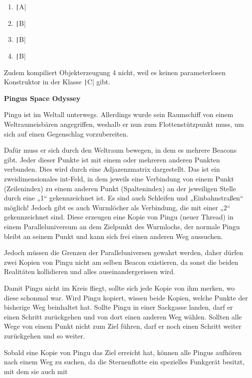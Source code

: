 \documentclass[11pt]{exam} %
\newcommand{\code}[1]{\texttt|#1|}
\begin{document}
\begin{questions}
\begin{solution}
\begin{enumerate}
\item \code{A}\par
\item \code{B}\par
\item \code{B}\par
\item \code{B}\par
\end{enumerate}
Zudem kompiliert Objekterzeugung 4 nicht, weil es keinen parameterlosen Konstruktor in der Klasse \code{C} gibt.
\end{solution}
\question \textbf{Pingus Space Odyssey}\par\nobreak
Pingu ist im Weltall unterwegs. Allerdings wurde sein Raumschiff von einem Weltraumeisbären angegriffen, weshalb er nun zum Flottenstützpunkt muss, um sich auf einen Gegenschlag vorzubereiten.\par
Dafür muss er sich durch den Weltraum bewegen, in dem es mehrere Beacons gibt. Jeder dieser
Punkte ist mit einem oder mehreren anderen Punkten verbunden. Dies wird durch eine
Adjazenzmatrix dargestellt. Das ist ein zweidimensionales int-Feld, in dem jeweils eine Verbindung
von einem Punkt (Zeilenindex) zu einem anderen Punkt (Spaltenindex) an der jeweiligen Stelle
durch eine „1“ gekennzeichnet ist. Es sind auch Schleifen und „Einbahnstraßen“ möglich!
Jedoch gibt es auch Wurmlöcher als Verbindung, die mit einer „2“ gekennzeichnet sind. Diese
erzeugen eine Kopie von Pingu (neuer Thread) in einem Paralleluniversum an dem Zielpunkt des
Wurmlochs, der normale Pingu bleibt an seinem Punkt und kann sich frei einen anderen Weg
aussuchen.\par
Jedoch müssen die Grenzen der Paralleluniversen gewahrt werden, daher dürfen zwei Kopien von
Pingu nicht am selben Beacon existieren, da sonst die beiden Realitäten kollidieren und alles
auseinandergerissen wird.\par
Damit Pingu nicht im Kreis fliegt, sollte sich jede Kopie von ihm merken, wo diese schonmal war.
Wird Pingu kopiert, wissen beide Kopien, welche Punkte der bisherige Weg beinhaltet hat.
Sollte Pingu in einer Sackgasse landen, darf er einen Schritt zurückgehen und von dort einen
anderen Weg wählen. Sollten alle Wege von einem Punkt nicht zum Ziel führen, darf er noch einen
Schritt weiter zurückgehen und so weiter.\par
Sobald eine Kopie von Pingu das Ziel erreicht hat, können alle Pingus aufhören nach einem Weg
zu suchen, da die Sternenflotte ein spezielles Funkgerät besitzt, mit dem sie auch mit

\end{questions}
\end{document}
